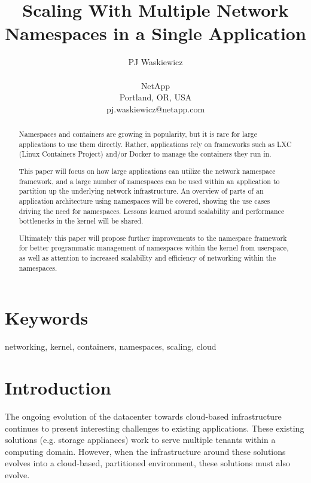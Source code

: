 \documentclass[letterpaper]{article}
\title{Scaling With Multiple Network Namespaces in a Single Application}
\author{PJ Waskiewicz\\
\\
NetApp\\
Portland, OR, USA\\
pj.waskiewicz@netapp.com\\
\newline
\newline
}
\begin{document}
 
\maketitle
\begin{abstract}
Namespaces and containers are growing in popularity, but it is rare for large applications to use them directly. Rather, applications rely on frameworks such as LXC (Linux Containers Project) and/or Docker to manage the containers they run in.

This paper will focus on how large applications can utilize the network namespace framework, and a large number of namespaces can be used within an application to partition up the underlying network infrastructure. An overview of parts of an application architecture using namespaces will be covered, showing the use cases driving the need for namespaces. Lessons learned around scalability and performance bottlenecks in the kernel will be shared.

Ultimately this paper will propose further improvements to the namespace framework for better programmatic management of namespaces within the kernel from userspace, as well as attention to increased scalability and efficiency of networking within the namespaces.
\end{abstract}

\section{Keywords}

networking, kernel, containers, namespaces, scaling, cloud

\section{Introduction}
The ongoing evolution of the datacenter towards cloud-based infrastructure continues to present interesting challenges to existing applications. These existing solutions (e.g. storage appliances) work to serve multiple tenants within a computing domain. However, when the infrastructure around these solutions evolves into a cloud-based, partitioned environment, these solutions must also evolve.
\end{document}
